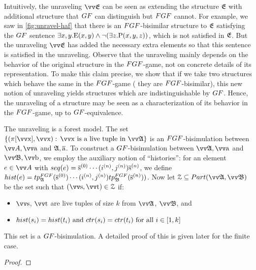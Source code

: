 Intuitively, the unraveling $\unravel{E}$ can be seen as extending the structure ${\mathfrak{E}}$ with additional structure that $\GF$ can distinguish but $\FGF$ cannot.
For example, we saw in \cref{fig:unravel-haf} that there is an $\FGF$-bisimilar structure to ${\mathfrak{E}}$ satisfying the $\GF$ sentence $\exists{x,y}. \mathrm{E}(x,y) \land \lnot (\exists z. \mathrm{P}(x,y,z))$, which is not satisfied in ${\mathfrak{E}}$.
But the unraveling $\unravel{E}$ has added the necessary extra elements so that this sentence is satisfied in the unraveling.
Observe that the unraveling mainly depends on the behavior of the original structure in the $\FGF$-game, not on concrete details of its representation.
To make this claim precise, we show that if we take two structures which behave the same in the $\FGF$-game (\ie{} they are $\FGF$-bisimilar), this new notion of unraveling yields structures which are indistinguishable by $\GF$.
Hence, the unraveling of a structure may be seen as a characterization of its behavior in the $\FGF$-game, up to $\GF$-equivalence.

\thminfunraveling*
\begin{proofsketch}
  The unraveling is a forest model.
  The set $\{(\pi[\elemtuptuplex], \elemtuptuplex):\, \elemtuptuplex\ \text{is a live tuple in}\ \unravel{A} \}$ is an $\FGF$-bisimulation between $\unraveldom{A}, \elemtuptuplea$ and ${\mathfrak{A}}, \overline{\mathrm{a}}$.
  To construct a $\GF$-bisimulation between $\unravel{A}, \elemtuptuplea$ and $\unravel{B}, \elemtuptupleb$, we employ the auxiliary notion of ``histories'': for an element $e \in \unraveldom{A}$ with $\seq{e} = \elemtuples^{(0)}\cdots(i^{(n)}, j^{(n)})\elemtuples^{(n)}$, we define $\mathsf{hist}(e) = \tp{\FGF}{\str{A}}{\elemtuples^{(0)}} \cdots (i^{(n)}, j^{(n)}) \tp{\FGF}{\str{B}}{\elemtuples^{(n)}})$.
  Now let $\bisimZ \subseteq \PartIso{\unravel{A}}{\unravel{B}}$ be the set such that $(\elemtuptuples, \elemtuptuplet) \in \bisimZ$ if:
  \begin{itemize}
    \item $\elemtuptuples$, $\elemtuptuplet$ are live tuples of size $k$ from $\unravel{A}$, $\unravel{B}$, and
    \item $\mathsf{hist}(s_{i}) = \mathsf{hist}(t_{i})\text{ and }\ctr{s_{i}} = \ctr{t_{i}}\text{ for all }i \in [1, k]$
  \end{itemize}
  This set is a $\GF$-bisimulation.
  A detailed proof of this is given later for the finite case.
\end{proofsketch}
\begin{proof}
\end{proof}
